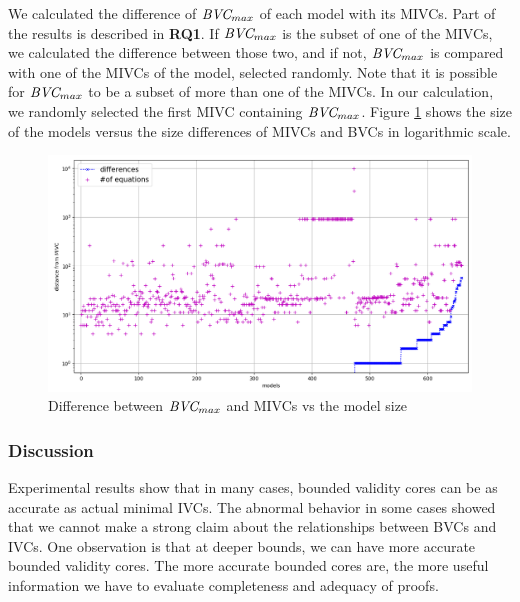 We calculated the difference of $\textit{BVC} _{max}$ of each model with its MIVCs. Part of the results is described in \textbf{RQ1}. If $\textit{BVC} _{max}$  is the subset of one of the MIVCs, we calculated the difference between those two, and if not, $\textit{BVC} _{max}$  is compared with one of the MIVCs of the model, selected randomly.  Note that it is possible for $\textit{BVC} _{max}$ to be a subset of more than one of the MIVCs. In our calculation, we randomly selected the first MIVC containing $\textit{BVC} _{max}$.
Figure \ref{fig:bvc-size} shows the size of the models versus the size differences of MIVCs and BVCs
in logarithmic scale.


 \begin{figure}
 \centering
  \includegraphics[width=\columnwidth]{figs/bvc_modelsize_yices.png}
  \caption{Difference between $\textit{BVC} _{max}$ and MIVCs vs the model size}
  \vspace{0.1in}
  \label{fig:bvc-size}
\end{figure}

\vspace{0.1in}
\subsubsection{Discussion}
Experimental results show that in many cases, bounded validity cores can be as accurate as actual minimal IVCs. The abnormal behavior in some cases showed that we cannot make a strong claim about the relationships between BVCs and IVCs. One observation is that at deeper bounds, we can have more accurate bounded validity cores. The more accurate bounded cores are, the more useful information we have to evaluate completeness and adequacy of proofs.

